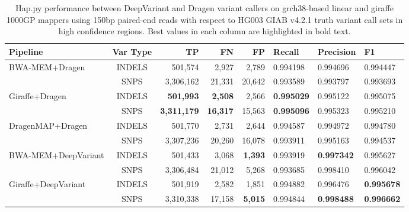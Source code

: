 \documentclass[11pt]{ucscthesis}
\begin{document}
\begin{table}[H]
    \centering
    \begin{tabular}{|l|c|r|r|r|l|l|l|}
     \hline
    Pipeline                                     & Var Type & TP                & FN             & FP            & Recall            & Precision         & F1                \\
    \hline
    \multirow{2}{*}{BWA-MEM+Dragen}           & INDELS    & 501,574           & 2,927          & 2,789         & 0.994198          & 0.994696      & 0.994447 \\
                                                & SNPS      & 3,306,162         & 21,331         & 20,642        & 0.993589          & 0.993797      & 0.993693 \\
    \hline
    \multirow{2}{*}{Giraffe+Dragen}           & INDELS    & \textbf{501,993}  & \textbf{2,508} & 2,566         & \textbf{0.995029} & 0.995122      & 0.995075 \\
                                                & SNPS      & \textbf{3,311,179}& \textbf{16,317}& 15,563        & \textbf{0.995096} & 0.995323      & 0.995210 \\
    \hline
    \multirow{2}{*}{DragenMAP+Dragen}        & INDELS    & 501,770           & 2,731          & 2,644         & 0.994587          & 0.994972      & 0.994780 \\
                                                & SNPS      & 3,307,236         & 20,260         & 16,078        & 0.993911          & 0.995163      & 0.994537 \\
    \hline
    \multirow{2}{*}{BWA-MEM+DeepVariant}      & INDELS    & 501,433           & 3,068          & \textbf{1,393}& 0.993919          & \textbf{0.997342} & 0.995627 \\
                                                & SNPS      & 3,306,484         & 21,012         & 5,268         & 0.993685          & 0.998410          & 0.996042 \\
    \hline
    \multirow{2}{*}{Giraffe+DeepVariant}      & INDELS    & 501,919           & 2,582          & 1,851         & 0.994882          & 0.996476          & \textbf{0.995678} \\
                                                & SNPS      & 3,310,338         & 17,158         & \textbf{5,015}& 0.994844          & \textbf{0.998488} & \textbf{0.996662} \\
    \hline
    \end{tabular}
\caption[Genotyping evaluation between DeepVariant calls of bwamem and giraffe 1000GP alignments against grch38-based references with Hap.py in HG003 using 35x 150bp paired-end reads]{Hap.py performance between DeepVariant and Dragen variant callers on grch38-based linear and giraffe 1000GP mappers using 150bp paired-end reads with respect to HG003 GIAB v4.2.1 truth variant call sets in high confidence regions. Best values in each column are highlighted in bold text.}
\label{tab:deepvariant_happy_high_conf_2x150_50x_hg003_grch38}
\end{table}
\end{document}
